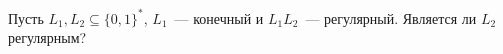 Пусть $L_1, L_2 \subseteq \{0, 1\}^*$, $L_1$~--- конечный и $L_1 L_2$~--- регулярный. Является ли $L_2$ регулярным?